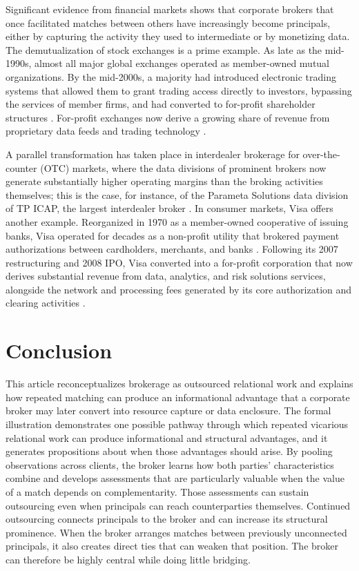 \documentclass[
]{article}
\begin{document}
Significant evidence from financial markets shows that corporate brokers that once facilitated matches between others have increasingly become principals, either by capturing the activity they used to intermediate or by monetizing data. The demutualization of stock exchanges is a prime example. As late as the mid-1990s, almost all major global exchanges operated as member-owned mutual organizations. By the mid-2000s, a majority had introduced electronic trading systems that allowed them to grant trading access directly to investors, bypassing the services of member firms, and had converted to for-profit shareholder structures \autocite{aggarwalDemutualizationCorporateGovernance2002,petryNationalMarketplacesGlobal2021}. For-profit exchanges now derive a growing share of revenue from proprietary data feeds and trading technology \autocite{mackenzieTradingSpeedLight2021,pardo-guerraAutomatingFinanceInfrastructures2019}.

A parallel transformation has taken place in interdealer brokerage for over-the-counter (OTC) markets, where the data divisions of prominent brokers now generate substantially higher operating margins than the broking activities themselves; this is the case, for instance, of the Parameta Solutions data division of TP ICAP, the largest interdealer broker \autocite{ARA_FullReport}. In consumer markets, Visa offers another example. Reorganized in 1970 as a member-owned cooperative of issuing banks, Visa operated for decades as a non-profit utility that brokered payment authorizations between cardholders, merchants, and banks \autocite{stearnsElectronicValueExchange2011}. Following its 2007 restructuring and 2008 IPO, Visa converted into a for-profit corporation that now derives substantial revenue from data, analytics, and risk solutions services, alongside the network and processing fees generated by its core authorization and clearing activities \autocite{VisaAnnualReport}.

\section{Conclusion}

This article reconceptualizes brokerage as outsourced relational work and explains how repeated matching can produce an informational advantage that a corporate broker may later convert into resource capture or data enclosure. The formal illustration demonstrates one possible pathway through which repeated vicarious relational work can produce informational and structural advantages, and it generates propositions about when those advantages should arise. By pooling observations across clients, the broker learns how both parties' characteristics combine and develops assessments that are particularly valuable when the value of a match depends on complementarity. Those assessments can sustain outsourcing even when principals can reach counterparties themselves. Continued outsourcing connects principals to the broker and can increase its structural prominence. When the broker arranges matches between previously unconnected principals, it also creates direct ties that can weaken that position. The broker can therefore be highly central while doing little bridging.
\end{document}
